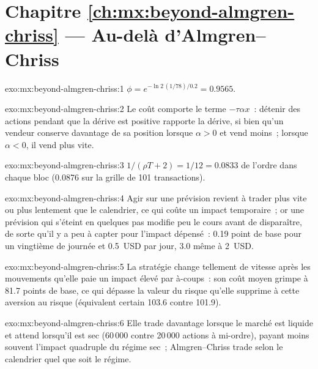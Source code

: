\section*{Chapitre \ref{ch:mx:beyond-almgren-chriss} --- Au-delà d'Almgren--Chriss}

\begin{solution}{exo:mx:beyond-almgren-chriss:1}
$\phi=e^{-\ln2\,(1/78)/0.2}=0.9565$.
\end{solution}

\begin{solution}{exo:mx:beyond-almgren-chriss:2}
Le coût comporte le terme $-\tau\alpha x$~: détenir des actions pendant que la dérive est positive rapporte la dérive, si bien qu'un vendeur conserve davantage de sa position lorsque $\alpha>0$
et vend moins~; lorsque $\alpha<0$, il vend plus vite.
\end{solution}

\begin{solution}{exo:mx:beyond-almgren-chriss:3}
$1/(\rho T+2)=1/12=0.0833$ de l'ordre dans chaque bloc (0.0876 sur la grille de 101 transactions).
\end{solution}

\begin{solution}{exo:mx:beyond-almgren-chriss:4}
Agir sur une prévision revient à trader plus vite ou plus lentement que le calendrier, ce qui coûte un impact temporaire~; or une prévision qui s'éteint en quelques pas modifie
peu le cours avant de disparaître, de sorte qu'il y a peu à capter pour l'impact dépensé~: 0.19 point de base pour un vingtième de journée et 0.5~USD par jour, 3.0 même
à 2~USD.
\end{solution}

\begin{solution}{exo:mx:beyond-almgren-chriss:5}
La stratégie change tellement de vitesse après les mouvements qu'elle paie un impact élevé par à-coups~: son coût moyen grimpe à 81.7 points de base, ce qui dépasse la valeur du risque
qu'elle supprime à cette aversion au risque (équivalent certain 103.6 contre 101.9).
\end{solution}

\begin{solution}{exo:mx:beyond-almgren-chriss:6}
Elle trade davantage lorsque le marché est liquide et attend lorsqu'il est sec (60\,000 contre 20\,000 actions à mi-ordre), payant moins souvent l'impact quadruple du régime sec~;
Almgren--Chriss trade selon le calendrier quel que soit le régime.
\end{solution}

